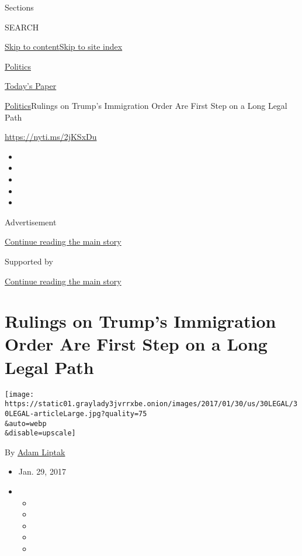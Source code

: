 Sections

SEARCH

\protect\hyperlink{site-content}{Skip to
content}\protect\hyperlink{site-index}{Skip to site index}

\href{https://www.nytimes3xbfgragh.onion/section/politics}{Politics}

\href{https://myaccount.nytimes3xbfgragh.onion/auth/login?response_type=cookie\&client_id=vi}{}

\href{https://www.nytimes3xbfgragh.onion/section/todayspaper}{Today's
Paper}

\href{/section/politics}{Politics}\textbar{}Rulings on Trump's
Immigration Order Are First Step on a Long Legal Path

\url{https://nyti.ms/2jKSxDu}

\begin{itemize}
\item
\item
\item
\item
\item
\end{itemize}

Advertisement

\protect\hyperlink{after-top}{Continue reading the main story}

Supported by

\protect\hyperlink{after-sponsor}{Continue reading the main story}

\hypertarget{rulings-on-trumps-immigration-order-are-first-step-on-a-long-legal-path}{%
\section{Rulings on Trump's Immigration Order Are First Step on a Long
Legal
Path}\label{rulings-on-trumps-immigration-order-are-first-step-on-a-long-legal-path}}

\texttt{[image: https://static01.graylady3jvrrxbe.onion/images/2017/01/30/us/30LEGAL/30LEGAL-articleLarge.jpg?quality=75\\\&auto=webp\\\&disable=upscale]}

By \href{http://www.nytimes3xbfgragh.onion/by/adam-liptak}{Adam Liptak}

\begin{itemize}
\item
  Jan. 29, 2017
\item
  \begin{itemize}
  \item
  \item
  \item
  \item
  \item
  \end{itemize}
\end{itemize}

